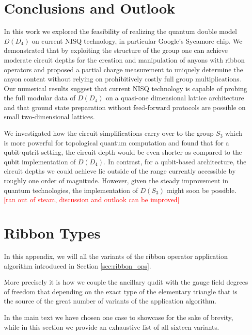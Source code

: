 \documentclass[two column]{article}
\newcommand{\caro}[1]{\textcolor{red}{[#1]}}
\begin{document}
\section{Conclusions and Outlook} \label{sec:outlook}
In this work we explored the feasibility of realizing the quantum double model $D(D_4)$ on current NISQ technology, in particular Google's Sycamore chip. We demonstrated that by exploiting the structure of the group one can achieve moderate circuit depths for the creation and manipulation of anyons with ribbon operators and proposed a partial charge measurement to uniquely determine the anyon content without relying on prohibitively costly full group multiplications. Our numerical results suggest that current NISQ technology is capable of probing the full modular data of $D(D_4)$ on a quasi-one dimensional lattice architecture and that ground state preparation without feed-forward protocols are possible on small two-dimensional lattices. 

We investigated how the circuit simplifications carry over to the group $S_3$ which is more powerful for topological quantum computation and found that for a qubit-qutrit setting, the circuit depth would be even shorter as compared to the qubit implementation of $D(D_4)$. In contrast, for a qubit-based architecture, the circuit depths we could achieve lie outside of the range currently accessible by roughly one order of magnitude. However, given the steady improvement in quantum technologies, the implementation of $D(S_3)$ might soon be possible. 
\caro{ran out of steam, discussion and outlook can be improved}


\FloatBarrier
\onecolumn
\appendix

\section{Ribbon Types}\label{app:ribs}


In this appendix, we will all the variants of the ribbon operator application algorithm introduced in Section \ref{sec:ribbon_ops}.

More precisely it is how we couple the ancillary qudit with the gauge field degrees of freedom that depending on the exact type of the elementary triangle that is the source of the great number of variants of the application algorithm. 

In the main text we have chosen one case to showcase for the sake of brevity, while in this section we provide an exhaustive list of all sixteen variants.
\end{document}
